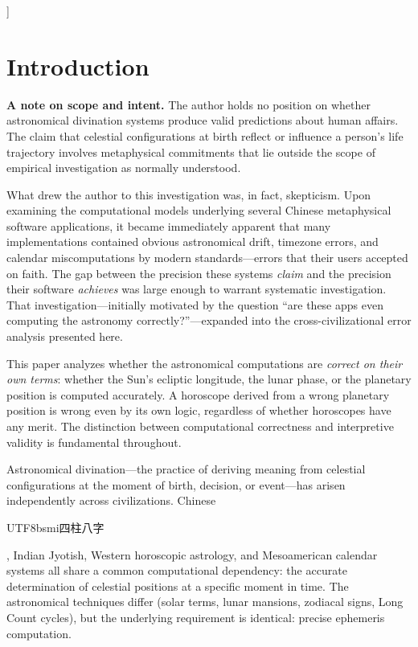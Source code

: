 \documentclass[10pt,a4paper]{article}
\newcommand{\zh}[1]{\begin{CJK}{UTF8}{bsmi}#1\end{CJK}}
\begin{document}
\vspace{1em}
]



\section{Introduction}
\label{sec:intro}

\begin{mdframed}[
  linecolor=black!40,
  backgroundcolor=black!3,
  roundcorner=4pt,
  linewidth=0.5pt,
  innertopmargin=8pt,
  innerbottommargin=8pt,
]
\small\noindent\textbf{A note on scope and intent.}
The author holds no position on whether astronomical divination
systems produce valid predictions about human affairs.  The claim
that celestial configurations at birth reflect or influence a
person's life trajectory involves metaphysical commitments that
lie outside the scope of empirical investigation as normally
understood.

What drew the author to this investigation was, in fact,
skepticism.  Upon examining the computational models underlying
several Chinese metaphysical software applications, it became
immediately apparent that many implementations contained obvious
astronomical drift, timezone errors, and calendar miscomputations
by modern standards---errors that their users accepted on faith.
The gap between the precision these systems \emph{claim} and the
precision their software \emph{achieves} was large enough to
warrant systematic investigation.  That investigation---initially
motivated by the question ``are these apps even computing the
astronomy correctly?''---expanded into the cross-civilizational
error analysis presented here.

This paper analyzes whether the astronomical computations are
\emph{correct on their own terms}: whether the Sun's ecliptic
longitude, the lunar phase, or the planetary position is computed
accurately.  A horoscope derived from a wrong planetary position
is wrong even by its own logic, regardless of whether horoscopes
have any merit.  The distinction between computational correctness
and interpretive validity is fundamental throughout.
\end{mdframed}

\medskip

Astronomical divination---the practice of deriving meaning from
celestial configurations at the moment of birth, decision, or
event---has arisen independently across civilizations.  Chinese
\zh{四柱八字}, Indian Jyotish, Western horoscopic astrology, and
Mesoamerican calendar systems all share a common computational
dependency: the accurate determination of celestial positions at a
specific moment in time.  The astronomical techniques differ (solar
terms, lunar mansions, zodiacal signs, Long Count cycles), but the
underlying requirement is identical: precise ephemeris computation.
\end{document}
